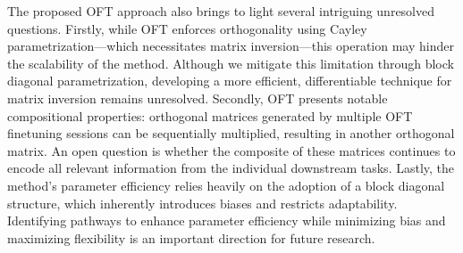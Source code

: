The proposed OFT approach also brings to light several intriguing unresolved questions. Firstly, while OFT enforces orthogonality using Cayley parametrization—which necessitates matrix inversion—this operation may hinder the scalability of the method. Although we mitigate this limitation through block diagonal parametrization, developing a more efficient, differentiable technique for matrix inversion remains unresolved. Secondly, OFT presents notable compositional properties: orthogonal matrices generated by multiple OFT finetuning sessions can be sequentially multiplied, resulting in another orthogonal matrix. An open question is whether the composite of these matrices continues to encode all relevant information from the individual downstream tasks. Lastly, the method’s parameter efficiency relies heavily on the adoption of a block diagonal structure, which inherently introduces biases and restricts adaptability. Identifying pathways to enhance parameter efficiency while minimizing bias and maximizing flexibility is an important direction for future research.